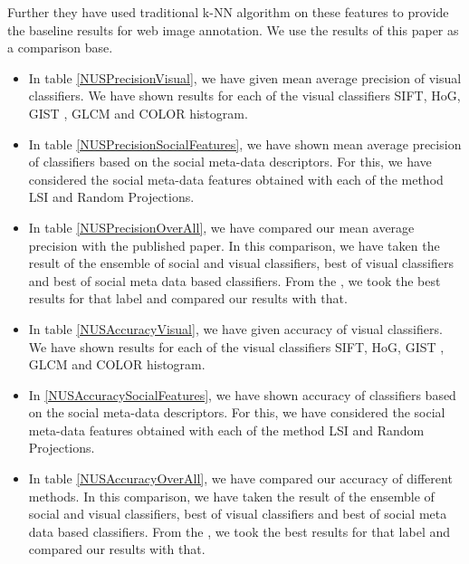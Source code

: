Further they have used traditional k-NN algorithm  on these features to provide the baseline results for web image annotation. We use the results of this paper as a comparison base.

\begin{itemize}
\item In table \ref{NUSPrecisionVisual}, we have given mean average precision of visual classifiers. We have shown results for each of the visual classifiers SIFT, HoG, GIST , GLCM and COLOR histogram.
\item In table \ref{NUSPrecisionSocialFeatures}, we have shown mean average precision of classifiers based on the social meta-data descriptors. For this, we have considered the social meta-data features obtained with each of the method LSI and Random Projections.
\item In table \ref{NUSPrecisionOverAll}, we have compared our mean average precision with the published paper. In this comparison, we have taken the result of the ensemble of social and visual classifiers,  best of visual classifiers and best of social meta data based classifiers. From the  \citet*{CLEF}, we took the best results for that label and compared our results with that.
\item In table \ref{NUSAccuracyVisual}, we have given accuracy of visual classifiers. We have shown results for each of the visual classifiers SIFT, HoG, GIST , GLCM and COLOR histogram.
\item In \ref{NUSAccuracySocialFeatures}, we have shown accuracy of classifiers based on the social meta-data descriptors. For this, we have considered the social meta-data features obtained with each of the method LSI and Random Projections.
\item In table \ref{NUSAccuracyOverAll}, we have compared our accuracy of different methods. In this comparison, we have taken the result of the ensemble of social and visual classifiers,  best of visual classifiers and best of social meta data based classifiers. From the  \citet*{NUS}, we took the best results for that label and compared our results with that.
\end{itemize}

